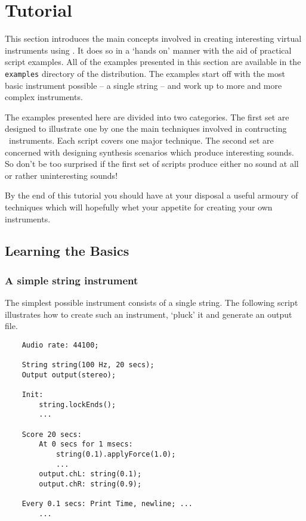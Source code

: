 \chapter{Tutorial}
\label{section:tutorial}
This section introduces the main concepts involved in creating
interesting virtual instruments using \tao. It does so in a 
`hands on' manner with the aid of practical script examples.
All of the examples presented in this section are available in the
\verb|examples| directory of the distribution. The examples start off with
the most basic instrument possible -- a single string -- and work up to more
and more complex instruments.

The examples presented here are divided into two categories. The first set
are designed to illustrate one by one the main techniques involved in 
contructing \tao\ instruments. Each script covers one major technique. The
second set are concerned with designing synthesis scenarios which produce
interesting sounds. So don't be too surprised if the first
set of scripts produce either no sound at all or rather uninteresting
sounds!

By the end of this tutorial you should have at your disposal a useful
armoury of techniques which will hopefully whet your appetite
for creating your own instruments.

\section{Learning the Basics}
\subsection{A simple string instrument}
The simplest possible instrument consists of a single string. The
following script illustrates how to create such an instrument,
`pluck' it and generate an output file. 

\begin{verbatim}
    Audio rate: 44100;

    String string(100 Hz, 20 secs);
    Output output(stereo);

    Init:
        string.lockEnds();
        ...

    Score 20 secs:
        At 0 secs for 1 msecs:
            string(0.1).applyForce(1.0);
            ...
        output.chL: string(0.1);
        output.chR: string(0.9);

	Every 0.1 secs: Print Time, newline; ...
        ...
\end{verbatim}

